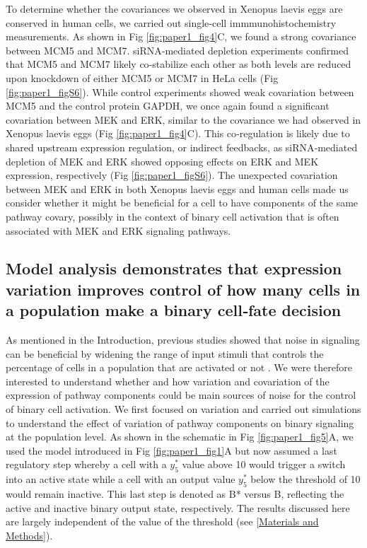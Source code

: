 To determine whether the covariances we observed in Xenopus laevis eggs are conserved in human cells, we carried out single‐cell immmunohistochemistry measurements. As shown in Fig \ref{fig:paper1_fig4}C, we found a strong covariance between MCM5 and MCM7. siRNA‐mediated depletion experiments confirmed that MCM5 and MCM7 likely co‐stabilize each other as both levels are reduced upon knockdown of either MCM5 or MCM7 in HeLa cells (Fig \ref{fig:paper1_figS6}). While control experiments showed weak covariation between MCM5 and the control protein GAPDH, we once again found a significant covariation between MEK and ERK, similar to the covariance we had observed in Xenopus laevis eggs (Fig \ref{fig:paper1_fig4}C). This co‐regulation is likely due to shared upstream expression regulation, or indirect feedbacks, as siRNA‐mediated depletion of MEK and ERK showed opposing effects on ERK and MEK expression, respectively (Fig \ref{fig:paper1_figS6}). The unexpected covariation between MEK and ERK in both Xenopus laevis eggs and human cells made us consider whether it might be beneficial for a cell to have components of the same pathway covary, possibly in the context of binary cell activation that is often associated with MEK and ERK signaling pathways.

\subsection{Model analysis demonstrates that expression variation improves control of how many cells in a population make a binary cell‐fate decision}

As mentioned in the Introduction, previous studies showed that noise in signaling can be beneficial by widening the range of input stimuli that controls the percentage of cells in a population that are activated or not \cite{Ahrends2014,Suderman2017}. We were therefore interested to understand whether and how variation and covariation of the expression of pathway components could be main sources of noise for the control of binary cell activation. We first focused on variation and carried out simulations to understand the effect of variation of pathway components on binary signaling at the population level. As shown in the schematic in Fig \ref{fig:paper1_fig5}A, we used the model introduced in Fig \ref{fig:paper1_fig1}A but now assumed a last regulatory step whereby a cell with a $y_5^*$ value above 10 would trigger a switch into an active state while a cell with an output value $y_5^*$ below the threshold of 10 would remain inactive. This last step is denoted as B* versus B, reflecting the active and inactive binary output state, respectively. The results discussed here are largely independent of the value of the threshold (see \ref{Materials and Methods}).

